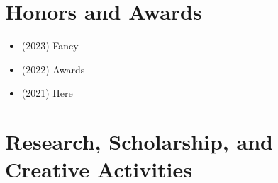 \section{Honors and Awards}
\begin{adjustwidth}{2em}{0pt}

\begin{itemize}
    \item (2023) Fancy
    \item (2022) Awards
    \item (2021) Here
\end{itemize}

\end{adjustwidth}

\section{Research, Scholarship, and Creative Activities}
